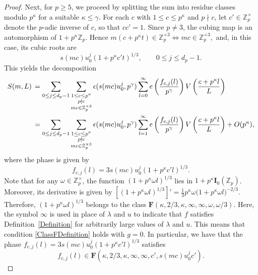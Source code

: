 \documentclass[11pt,reqno]{amsart}
\numberwithin{equation}{section}
\theoremstyle{plain}
\theoremstyle{definition}
\begin{document}
\begin{proof}
Next, for $p\geq 5$, we proceed by splitting the sum into residue classes modulo $p^{\kappa}$ for a suitable $\kappa\leq\gamma$. 
For each $c$ with $1\leq c\leq p^\kappa$ and $p\nmid c$, let
$c'\in\mathbb Z_p^\times$ denote the $p$-adic inverse of $c$, so that
$cc'=1.$
Since \(p\neq3\), the cubing map is an automorphism of
\(1+p^\kappa\mathbb Z_p\). Hence
$m(c+p^\kappa t)\in\mathbb Z_p^{\times3}\Longleftrightarrow mc\in\mathbb Z_p^{\times3},$
and, in this case, its cubic roots are
$$
s(mc)u_0^j(1+p^\kappa c't)^{1/3}, \qquad 0\leq j\leq d_p-1.
$$
This yields the decomposition
\begin{align}\label{SumAspAdic}
S(m,L)&\,=\sum_{0 \leq j \leq d_p - 1}\sum_{\substack{1 \leq c \leq p^\kappa\\ p \nmid c\\ mc\in\mathbb Z_p^{\times3}}} \epsilon(s(mc)u_0^j,p^\gamma)
\sum_{l=0}^\infty e\left(\frac{f_{c, j}(l)}{p^\gamma}\right) V\left(\frac{c + p^\kappa l}{L}\right) \notag\\
&\,= \sum_{0 \leq j \leq d_p - 1}\sum_{\substack{1 \leq c \leq p^\kappa\\ p \nmid c\\ mc\in\mathbb Z_p^{\times3}}}\epsilon(s(mc)u_0^j,p^\gamma)
\sum_{l=1}^\infty e\left(\frac{f_{c, j}(l)}{p^\gamma}\right) V\left(\frac{c + p^\kappa l}{L}\right) + O(p^{\kappa}),
\end{align}
where the phase is given by
\begin{equation*}
f_{c, j}(l) = 3 s(mc) u_0^{j} (1 + p^{\kappa} c' l)^{1/3}.
\end{equation*}
Note that for any $\omega\in\mathbb{Z}^{\times}_p$, the function $(1+p^{\kappa}\omega l)^{1/3}$ lies in $1+p^{\kappa}\mathbf{I}_0(\mathbb{Z}_p)$. 
Moreover, its derivative is given by $\left[(1+p^{\kappa}\omega l)^{1/3}\right]'=\frac{1}{3}p^{\kappa}\omega\big(1+p^{\kappa}\omega l\big)^{-2/3}$. 
Therefore, $(1+p^{\kappa}\omega l)^{1/3}$ belongs to the class $\mathbf{F}(\kappa,2/3,\kappa,\infty,\infty,\omega,\omega/3)$.
Here, the symbol $\infty$ is used in place of $\lambda$ and $u$ to indicate that $f$ satisfies Definition~\ref{Definition} for arbitrarily large values of $\lambda$ and $u$. This means that condition \eqref{ClassFDefinition} holds with $g=0$. 
In particular, we have that the phase $f_{c, j}(l) = 3 s(mc) u_0^{j} (1 + p^{\kappa} c' l)^{1/3}$ satisfies
\begin{equation*}
f_{c, j}(l) \in \mathbf{F}(\kappa, 2/3, \kappa,\infty, \infty, c', s(mc) u_0^{j}c').
\end{equation*}


\end{proof}
\end{document}
